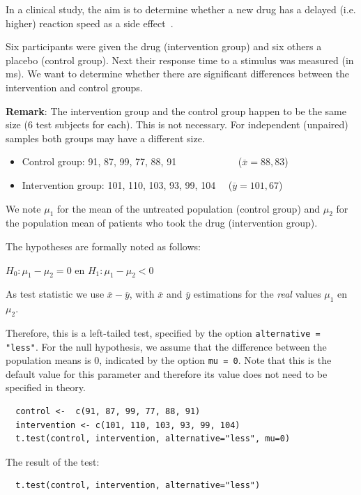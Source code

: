 \begin{example}
  In a clinical study, the aim is to determine whether a new drug has a delayed (i.e. higher) reaction speed as a side effect~\autocite{Lindquist}. 
  
  Six participants were given the drug (intervention group) and six others a placebo (control group). Next their response time to a stimulus was measured (in ms). We want to determine whether there are significant differences between the intervention and control groups.
  
  \textbf{Remark}: The intervention group and the control group happen to be the same size (6 test subjects for each).
  This is not necessary. For independent (unpaired) samples both groups may have a different size.
  
  \begin{itemize}
    \item Control group: 91, 87, 99, 77, 88, 91 ~~~~~~~~~~~~($\overline{x}=88,83$)
    \item Intervention group: 101, 110, 103, 93, 99, 104 ~~($\overline{y}=101,67$)
  \end{itemize}
  
  We note $\mu_1$ for the mean of the untreated population (control group) and $\mu_2$ for the population mean of patients who took the drug (intervention group).
  
  The hypotheses are formally noted as follows:
  
  $H_0: \mu_1 - \mu_2 = 0$ en $H_1: \mu_1 - \mu_2 < 0$
  
  As test statistic we use $\overline{x}-\overline{y}$, with $\overline{x}$ and $\overline{y}$ estimations for the \textit{real} values $\mu_1$ en $\mu_2$.

  Therefore, this is a left-tailed test, specified by the option \texttt{alternative = "less"}. For the null hypothesis, we assume that the difference between the population means is 0, indicated by the option \texttt{mu = 0}. Note that this is the default value for this parameter and therefore its value does not need to be specified in theory.

  \begin{lstlisting}
  control <-  c(91, 87, 99, 77, 88, 91)
  intervention <- c(101, 110, 103, 93, 99, 104)
  t.test(control, intervention, alternative="less", mu=0)
  \end{lstlisting}
  
  The result of the test:
  
  \begin{verbatim}
  t.test(control, intervention, alternative="less")
  

\end{verbatim}
\end{example}
